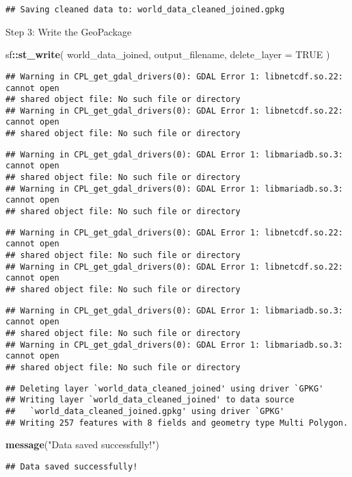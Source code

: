 \documentclass[
]{article}
\newenvironment{Shaded}{\begin{snugshade}}{\end{snugshade}}
\newcommand{\AttributeTok}[1]{\textcolor[rgb]{0.13,0.29,0.53}{#1}}
\newcommand{\ConstantTok}[1]{\textcolor[rgb]{0.56,0.35,0.01}{#1}}
\newcommand{\FunctionTok}[1]{\textcolor[rgb]{0.13,0.29,0.53}{\textbf{#1}}}
\newcommand{\NormalTok}[1]{#1}
\newcommand{\SpecialCharTok}[1]{\textcolor[rgb]{0.81,0.36,0.00}{\textbf{#1}}}
\newcommand{\StringTok}[1]{\textcolor[rgb]{0.31,0.60,0.02}{#1}}
\begin{document}
\begin{verbatim}
## Saving cleaned data to: world_data_cleaned_joined.gpkg
\end{verbatim}

Step 3: Write the GeoPackage

\begin{Shaded}
\begin{Highlighting}[]
\NormalTok{sf}\SpecialCharTok{::}\FunctionTok{st\_write}\NormalTok{(}
\NormalTok{  world\_data\_joined, output\_filename, }\AttributeTok{delete\_layer =} \ConstantTok{TRUE}
\NormalTok{)}
\end{Highlighting}
\end{Shaded}

\begin{verbatim}
## Warning in CPL_get_gdal_drivers(0): GDAL Error 1: libnetcdf.so.22: cannot open
## shared object file: No such file or directory
## Warning in CPL_get_gdal_drivers(0): GDAL Error 1: libnetcdf.so.22: cannot open
## shared object file: No such file or directory
\end{verbatim}

\begin{verbatim}
## Warning in CPL_get_gdal_drivers(0): GDAL Error 1: libmariadb.so.3: cannot open
## shared object file: No such file or directory
## Warning in CPL_get_gdal_drivers(0): GDAL Error 1: libmariadb.so.3: cannot open
## shared object file: No such file or directory
\end{verbatim}

\begin{verbatim}
## Warning in CPL_get_gdal_drivers(0): GDAL Error 1: libnetcdf.so.22: cannot open
## shared object file: No such file or directory
## Warning in CPL_get_gdal_drivers(0): GDAL Error 1: libnetcdf.so.22: cannot open
## shared object file: No such file or directory
\end{verbatim}

\begin{verbatim}
## Warning in CPL_get_gdal_drivers(0): GDAL Error 1: libmariadb.so.3: cannot open
## shared object file: No such file or directory
## Warning in CPL_get_gdal_drivers(0): GDAL Error 1: libmariadb.so.3: cannot open
## shared object file: No such file or directory
\end{verbatim}

\begin{verbatim}
## Deleting layer `world_data_cleaned_joined' using driver `GPKG'
## Writing layer `world_data_cleaned_joined' to data source 
##   `world_data_cleaned_joined.gpkg' using driver `GPKG'
## Writing 257 features with 8 fields and geometry type Multi Polygon.
\end{verbatim}

\begin{Shaded}
\begin{Highlighting}[]
\FunctionTok{message}\NormalTok{(}\StringTok{"Data saved successfully!"}\NormalTok{)}
\end{Highlighting}
\end{Shaded}

\begin{verbatim}
## Data saved successfully!
\end{verbatim}
\end{document}

